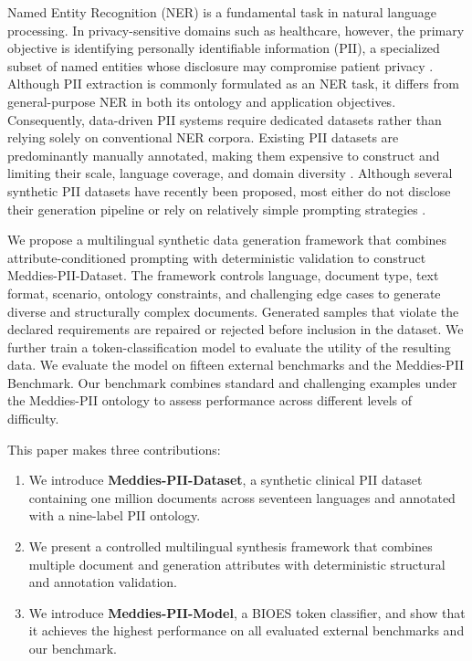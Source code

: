 \documentclass[11pt]{article}
\begin{document}
Named Entity Recognition (NER) is a fundamental task in natural language processing. In privacy-sensitive domains such as healthcare, however, the primary objective is identifying personally identifiable information (PII), a specialized subset of named entities whose disclosure may compromise patient privacy \cite{savkin-etal-2025-spy}. Although PII extraction is commonly formulated as an NER task, it differs from general-purpose NER in both its ontology and application objectives. Consequently, data-driven PII systems require dedicated datasets rather than relying solely on conventional NER corpora. Existing PII datasets are predominantly manually annotated, making them expensive to construct and limiting their scale, language coverage, and domain diversity \cite{neamatullah2008automated,uzuner2007evaluating,stubbs2015automated}. Although several synthetic PII datasets have recently been proposed, most either do not disclose their generation pipeline or rely on relatively simple prompting strategies \cite{ai4privacy_openpii_1_5m_2026,gretel-pii-docs-en-v1,nemotron-pii}.

We propose a multilingual synthetic data generation framework that combines attribute-conditioned prompting with deterministic validation to construct Meddies-PII-Dataset. The framework controls language, document type, text format, scenario, ontology constraints, and challenging edge cases to generate diverse and structurally complex documents. Generated samples that violate the declared requirements are repaired or rejected before inclusion in the dataset. We further train a token-classification model to evaluate the utility of the resulting data. We evaluate the model on fifteen external benchmarks and the Meddies-PII Benchmark. Our benchmark combines standard and challenging examples under the Meddies-PII ontology to assess performance across different levels of difficulty.

This paper makes three contributions:
\begin{enumerate}
\item We introduce \textbf{Meddies-PII-Dataset}, a synthetic clinical PII dataset containing one million documents across seventeen languages and annotated with a nine-label PII ontology.
\item We present a controlled multilingual synthesis framework that combines multiple document and generation attributes with deterministic structural and annotation validation.
\item We introduce \textbf{Meddies-PII-Model}, a BIOES token classifier, and show that it achieves the highest performance on all evaluated external benchmarks and our benchmark.
\end{enumerate}
\end{document}
